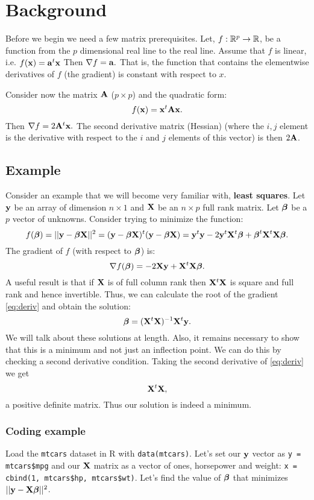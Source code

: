 \chapter{Background}
\label{chap:background}

Before we begin we need a few matrix prerequisites. Let,
$f: \mathbb{R}^p \rightarrow \mathbb{R}$,
be a function from the $p$ dimensional real line to the real line.
Assume that $f$ is linear, i.e. $f(\mathbf{x}) = \mathbf{a}^t \mathbf{x}$
Then $ \nabla f = \mathbf{a}.$ That is, the function that
contains the elementwise derivatives of $f$ (the gradient)
is constant with respect to $x$. 

Consider now the matrix $\mathbf{A}$
($p\times p$) and the quadratic form:
$$
f(\mathbf{x}) =  \mathbf{x}^t \mathbf{A} \mathbf{x}.
$$
Then  $ \nabla f = 2 \mathbf{A}^t \mathbf{x}.$ The second derivative matrix (Hessian)
(where the $i, j$ element is the derivative
with respect to the $i$ and $j$ elements of this vector)
is then $2 \mathbf{A} $.

\section{Example}

Consider an example that we will become very familiar with, {\bf least squares}.
Let $\mathbf{y}$ be an array of dimension $n\times 1$ and 
$\mathbf{X}$ be an $n\times p$ full rank matrix. Let $\boldsymbol{\beta}$ be a
$p$ vector of unknowns. Consider trying to minimize the function:
$$
f(\boldsymbol{\beta}) = ||\mathbf{y} - \boldsymbol{\beta} \mathbf{X}||^2 = (\mathbf{y} - \boldsymbol{\beta} \mathbf{X})^t (\mathbf{y} - \boldsymbol{\beta} \mathbf{X})
= \mathbf{y}^t \mathbf{y} - 2 \mathbf{y}^t \mathbf{X}^t \boldsymbol{\beta} + \boldsymbol{\beta}^t \mathbf{X}^t \mathbf{X} \boldsymbol{\beta}.
$$
The gradient of $f$ (with respect to $\boldsymbol{\beta}$) is:
\begin{equation}
\label{eq:deriv}
\nabla f(\boldsymbol{\beta}) = -2 \mathbf{X} \mathbf{y} + \mathbf{X}^t\mathbf{X} \boldsymbol{\beta}.
\end{equation}
A useful result is that if $\mathbf{X}$ is of full column rank then
$\mathbf{X}^t \mathbf{X}$ is square and full rank and hence invertible. Thus, we can
calculate the root of the gradient \eqref{eq:deriv} and obtain the solution:
$$
\boldsymbol{\beta} = (\mathbf{X}^t \mathbf{X})^{-1} \mathbf{X}^t \mathbf{y}. 
$$
We will talk about these solutions at length. Also, it remains
necessary to show that this is a minimum and not just an
inflection point. We can do this by checking a second derivative
condition. Taking the second derivative of \eqref{eq:deriv} we 
get
$$
\mathbf{X}^t\mathbf{X},
$$
a positive definite matrix. Thus our solution is indeed a minimum.

\subsection{Coding example}
Load the \texttt{mtcars} dataset in R with \texttt{data(mtcars)}.
Let's set our $\mathbf{y}$ vector as \texttt{y = mtcars\$mpg} and our
$\mathbf{X}$ matrix as a vector of ones, horsepower and weight:
\texttt{x = cbind(1, mtcars\$hp, mtcars\$wt)}. Let's find the
value of $\boldsymbol{\beta}$ that minimizes $|| \mathbf{y} - \mathbf{X} \boldsymbol{\beta}||^2$. 

